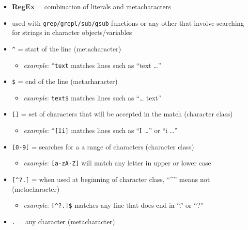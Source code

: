 \documentclass[
]{article}
\providecommand{\tightlist}{%
  \setlength{\itemsep}{0pt}\setlength{\parskip}{0pt}}
\begin{document}
\begin{itemize}
\tightlist
\item
  \textbf{RegEx} = combination of literals and metacharacters
\item
  used with \texttt{grep/grepl/sub/gsub} functions or any other that
  involve searching for strings in character objects/variables
\item
  \texttt{\^{}} = start of the line (metacharacter)

  \begin{itemize}
  \tightlist
  \item
    \emph{example}: \texttt{\^{}text} matches lines such as ``text
    \ldots{}''
  \end{itemize}
\item
  \texttt{\$} = end of the line (metacharacter)

  \begin{itemize}
  \tightlist
  \item
    \emph{example}: \texttt{text\$} matches lines such as ``\ldots{}
    text''
  \end{itemize}
\item
  \texttt{{[}{]}} = set of characters that will be accepted in the match
  (character class)

  \begin{itemize}
  \tightlist
  \item
    \emph{example}: \texttt{\^{}{[}Ii{]}} matches lines such as ``I
    \ldots{}'' or ``i \ldots{}''
  \end{itemize}
\item
  \texttt{{[}0-9{]}} = searches for a a range of characters (character
  class)

  \begin{itemize}
  \tightlist
  \item
    \emph{example}: \texttt{{[}a-zA-Z{]}} will match any letter in upper
    or lower case
  \end{itemize}
\item
  \texttt{{[}\^{}?.{]}} = when used at beginning of character class,
  ``\^{}'' means not (metacharacter)

  \begin{itemize}
  \tightlist
  \item
    \emph{example}: \texttt{{[}\^{}?.{]}\$} matches any line that does
    end in ``.'' or ``?''
  \end{itemize}
\item
  \texttt{.} = any character (metacharacter)


\end{itemize}
\end{document}
